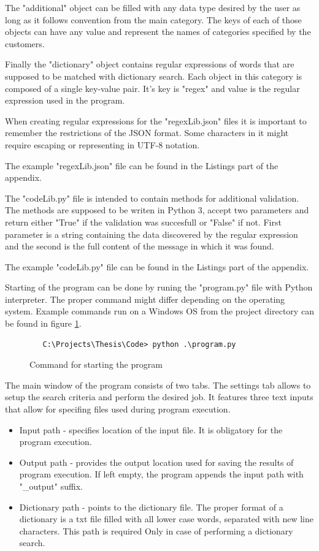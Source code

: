 \documentclass[a4paper,twoside,12pt]{book}
\begin{document}
The "additional" object can be filled with any data type desired by the user as long 
as it follows convention from the main category. The keys of each of those objects can have any value and represent the names of categories
specified by the customers.

Finally the "dictionary" object contains regular expressions of words that are supposed to be matched with dictionary search. Each object in this category 
is composed of a single key-value pair. It's key is "regex" and value is the regular expression used in the program. 

When creating regular expressions for the "regexLib.json" files it is important to remember the restrictions of the 
JSON format. Some characters in it might require escaping or representing in UTF-8 notation.

The example "regexLib.json" file can be found in the Listings part of the appendix.

The "codeLib.py" file is intended to contain methods for additional validation. The methods are supposed
to be writen in Python 3, accept two parameters and return either "True" if the validation was succesfull
or "False" if not. First parameter is a string containing the data discovered by the regular expression and
the second is the full content of the message in which it was found.

The example "codeLib.py" file can be found in the Listings part of the appendix.

Starting of the program can be done by runing the "program.py" file with Python interpreter. The proper command
might differ depending on the operating system. Example commands run on a Windows OS from the project directory
can be found in figure \ref{fig:startCommand}.

\begin{figure}
   \centering
   \begin{lstlisting}
   C:\Projects\Thesis\Code> python .\program.py
   \end{lstlisting}
   \caption{Command for starting the program}
   \label{fig:startCommand}
\end{figure}

The main window of the program consists of two tabs. The settings tab allows to setup the search criteria and perform
the desired job. It features three text inputs that allow for specifing files used during program execution.

\begin{itemize}
   \item Input path - specifies location of the input file. It is obligatory for the program execution.
   \item Output path - provides the output location used for saving the results of program execution. 
   If left empty, the program appends the input path with "\_output" suffix. 
   \item Dictionary path - points to the dictionary file. The proper format of a dictionary
   is a txt file filled with all lower case words, separated with new line characters. This path is required
   Only in case of performing a dictionary search.
\end{itemize}
\end{document}
